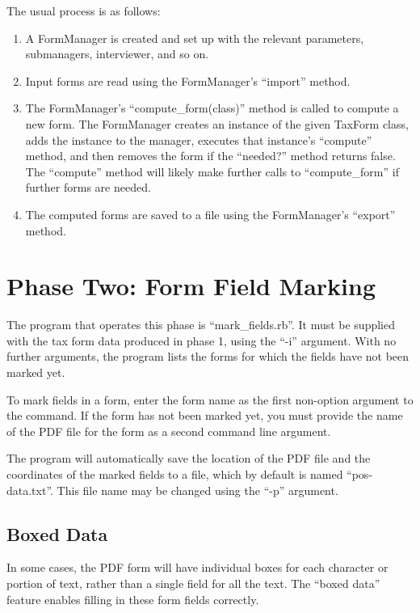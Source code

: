 \documentclass[12pt]{article}
\begin{document}
The usual process is as follows:
\begin{enumerate}
\item A FormManager is created and set up with the relevant parameters,
submanagers, interviewer, and so on.
\item Input forms are read using the FormManager's ``import'' method.
\item The FormManager's ``compute\_form(class)'' method is called to compute a
new form. The FormManager creates an instance of the given TaxForm class,
adds the instance to the manager, executes that instance's ``compute'' method,
and then removes the form if the ``needed?\@'' method returns false. The
``compute'' method will likely make further calls to ``compute\_form'' if
further forms are needed.
\item The computed forms are saved to a file using the FormManager's ``export''
method.
\end{enumerate}



\section{Phase Two: Form Field Marking}

The program that operates this phase is ``mark\_fields.rb''. It must be supplied
with the tax form data produced in phase 1, using the ``-i'' argument. With no
further arguments, the program lists the forms for which the fields have not
been marked yet.

To mark fields in a form, enter the form name as the first non-option argument
to the command. If the form has not been marked yet, you must provide the name
of the PDF file for the form as a second command line argument.

The program will automatically save the location of the PDF file and the
coordinates of the marked fields to a file, which by default is named
``pos-data.txt''. This file name may be changed using the ``-p'' argument.




\subsection{Boxed Data}

In some cases, the PDF form will have individual boxes for each character or
portion of text, rather than a single field for all the text. The ``boxed data''
feature enables filling in these form fields correctly.
\end{document}
